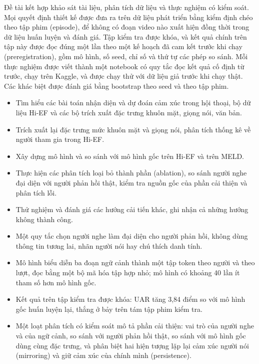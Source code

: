\vspace{0.3cm}

Đề tài kết hợp khảo sát tài liệu, phân tích dữ liệu và thực nghiệm có kiểm soát. Mọi quyết định thiết kế được đưa ra trên dữ liệu phát triển bằng kiểm định chéo theo tập phim (episode), để không có đoạn video nào xuất hiện đồng thời trong dữ liệu huấn luyện và đánh giá. Tập kiểm tra được khóa, và kết quả chính trên tập này được đọc đúng một lần theo một kế hoạch đã cam kết trước khi chạy (preregistration), gồm mô hình, số seed, chỉ số và thứ tự các phép so sánh. Mỗi thực nghiệm được viết thành một notebook có quy tắc đọc kết quả cố định từ trước, chạy trên Kaggle, và được chạy thử với dữ liệu giả trước khi chạy thật. Các khác biệt được đánh giá bằng bootstrap theo seed và theo tập phim.

\vspace{0.3cm}

\begin{itemize}
	\item Tìm hiểu các bài toán nhận diện và dự đoán cảm xúc trong hội thoại, bộ dữ liệu Hi-EF và các bộ trích xuất đặc trưng khuôn mặt, giọng nói, văn bản.
	\item Trích xuất lại đặc trưng mức khuôn mặt và giọng nói, phân tích thống kê về người tham gia trong Hi-EF.
	\item Xây dựng mô hình \model{} và so sánh với mô hình gốc trên Hi-EF và trên MELD.
	\item Thực hiện các phân tích loại bỏ thành phần (ablation), so sánh người nghe đại diện với người phản hồi thật, kiểm tra nguồn gốc của phần cải thiện và phân tích lỗi.
	\item Thử nghiệm và đánh giá các hướng cải tiến khác, ghi nhận cả những hướng không thành công.
\end{itemize}

\vspace{0.3cm}

\begin{itemize}
	\item Một quy tắc chọn người nghe làm đại diện cho người phản hồi, không dùng thông tin tương lai, nhãn người nói hay chú thích danh tính.
	\item Mô hình \model{} biểu diễn ba đoạn ngữ cảnh thành một tập token theo người và theo lượt, đọc bằng một bộ mã hóa tập hợp nhỏ; mô hình có khoảng 40 lần ít tham số hơn mô hình gốc.
	\item Kết quả trên tập kiểm tra được khóa: UAR tăng 3,84 điểm so với mô hình gốc huấn luyện lại, thắng ở bảy trên tám tập phim kiểm tra.
	\item Một loạt phân tích có kiểm soát mô tả phần cải thiện: vai trò của người nghe và của ngữ cảnh, so sánh với người phản hồi thật, so sánh với mô hình gốc dùng cùng đặc trưng, và phân biệt hai hiện tượng lặp lại cảm xúc người nói (mirroring) và giữ cảm xúc của chính mình (persistence).
\end{itemize}

